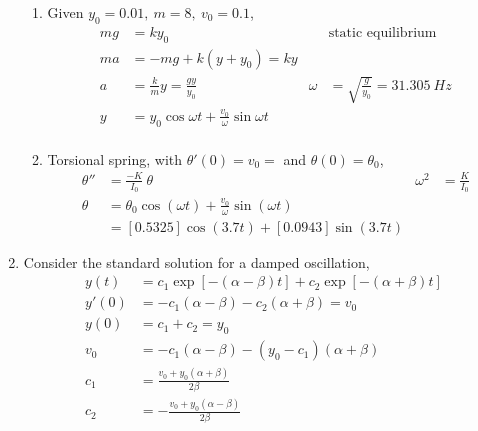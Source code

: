 \begin{enumerate}
\begin{enumerate}
              \item Given $ y_{0} = 0.01,\ m = 8,\ v_{0} = 0.1 $,
                    \begin{align}
                        mg     & = ky_{0}                                    &
                               & \text{static equilibrium}                     \\
                        ma     & = -mg + k(y + y_{0}) = ky                     \\
                        a      & = \frac{k}{m}y = \frac{gy}{y_{0}}           &
                        \omega & = \sqrt{\frac{g}{y_{0}}} = \SI{31.305}{Hz}    \\
                        y      & = y_{0}\cos \omega t + \frac{v_{0}}{\omega}
                        \sin \omega t                                          \\
                    \end{align}

              \item Torsional spring, with $ \theta' (0) = v_{0} = $ and
                    $ \theta(0) = \theta_{0} $,
                    \begin{align}
                        \theta ''  & = \frac{-K}{I_{0}}\ \theta                    &
                        \omega^{2} & = \frac{K}{I_{0}}                               \\
                        \theta     & = \theta_{0} \cos(\omega t)
                        + \frac{v_{0}}{\omega} \sin(\omega t)                        \\
                                   & = [0.5325] \cos(3.7 t) + [0.0943] \sin(3.7 t)
                    \end{align}
          \end{enumerate}

    \item Consider the standard solution for a damped oscillation,
          \begin{align}
              y(t)  & = c_{1}\exp\left[ -(\alpha - \beta)t \right]
              + c_{2}\exp\left[ -(\alpha + \beta)t \right]                       \\
              y'(0) & = -c_{1}(\alpha - \beta) - c_{2}(\alpha + \beta) = v_{0}   \\
              y(0)  & = c_{1} + c_{2} = y_{0}                                    \\
              v_{0} & = -c_{1}(\alpha - \beta) - (y_{0} - c_{1})(\alpha + \beta) \\
              c_{1} & =\frac{v_{0} + y_{0}(\alpha + \beta)}{2\beta}              \\
              c_{2} & = -\frac{v_{0} + y_{0}(\alpha - \beta)}{2\beta}
          \end{align}


\end{enumerate}
